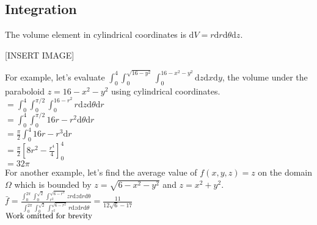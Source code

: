 \subsection{Integration}
\noindent
The volume element in cylindrical coordinates is $\mathrm{d}V = r\mathrm{d}r\mathrm{d}\theta\mathrm{d}z$.

[INSERT IMAGE]

\noindent
For example, let's evaluate $\int_{0}^{4}{\int_{0}^{\sqrt{16 - y^2}}{\int_{0}^{16 - x^2 - y^2}{\mathrm{d}z}\mathrm{d}x}\mathrm{d}y}$, the volume under the paraboloid $z = 16 - x^2 - y^2$ using cylindrical coordinates.\\
\indent
$= \int_{0}^{4}{\int_{0}^{\pi/2}{\int_{0}^{16 - r^2}{r\mathrm{d}z}\mathrm{d}\theta}\mathrm{d}r}$\\
\indent
$= \int_{0}^{4}{\int_{0}^{\pi/2}{16r - r^2\mathrm{d}\theta}\mathrm{d}r}$\\
\indent
$= \frac{\pi}{2}\int_{0}^{4}{16r - r^3\mathrm{d}r}$\\
\indent
$= \frac{\pi}{2}\left[8r^2 - \frac{r^4}{4}\right]_0^4$\\
\indent
$= 32\pi$\\

\noindent
For another example, let's find the average value of $f(x,y,z) = z$ on the domain $\Omega$ which is bounded by $z = \sqrt{6-x^2-y^2}$ and $z = x^2+y^2$.\\
\indent
$\bar{f} = \frac{\int_{0}^{2\pi}{\int_{0}^{\sqrt{2}}{\int_{r^2}^{\sqrt{6 - r^2}}{zr\mathrm{d}z}\mathrm{d}r}\mathrm{d\theta}}}{\int_{0}^{2\pi}{\int_{0}^{\sqrt{2}}{\int_{r^2}^{\sqrt{6 - r^2}}{r\mathrm{d}z}\mathrm{d}r}\mathrm{d}\theta}}=\frac{11}{12\sqrt{6} - 17}$\\
\indent
$\small{\text{Work omitted for brevity}}$